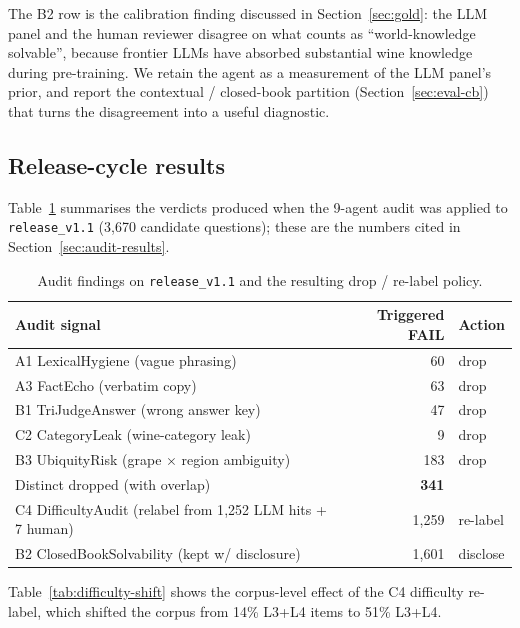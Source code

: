 The B2 row is the calibration finding discussed in
Section~\ref{sec:gold}: the LLM panel and the human reviewer disagree
on what counts as ``world-knowledge solvable'', because frontier LLMs
have absorbed substantial wine knowledge during pre-training. We retain
the agent as a measurement of the LLM panel's prior, and report the
contextual / closed-book partition (Section~\ref{sec:eval-cb}) that
turns the disagreement into a useful diagnostic.

\subsection{Release-cycle results}
\label{app:audit-agents}

Table~\ref{tab:audit_results} summarises the verdicts produced when
the 9-agent audit was applied to \texttt{release\_v1.1} (3{,}670
candidate questions); these are the numbers cited in
Section~\ref{sec:audit-results}.

\begin{table}[h]
  \centering
  \caption{Audit findings on \texttt{release\_v1.1} and the resulting
    drop / re-label policy.}
  \label{tab:audit_results}
  \footnotesize
  \begin{tabular}{lrl}
    \toprule
    Audit signal & Triggered FAIL & Action \\
    \midrule
    A1 LexicalHygiene (vague phrasing)               & 60   & drop \\
    A3 FactEcho (verbatim copy)                      & 63   & drop \\
    B1 TriJudgeAnswer (wrong answer key)             & 47   & drop \\
    C2 CategoryLeak (wine-category leak)             & 9    & drop \\
    B3 UbiquityRisk (grape $\times$ region ambiguity)& 183  & drop \\
    \midrule
    Distinct dropped (with overlap)                  & \textbf{341} & \\
    \midrule
    C4 DifficultyAudit (relabel from 1{,}252 LLM hits + 7 human)
                                                     & 1{,}259 & re-label \\
    B2 ClosedBookSolvability (kept w/ disclosure)     & 1{,}601 & disclose \\
    \bottomrule
  \end{tabular}
\end{table}

Table~\ref{tab:difficulty-shift} shows the corpus-level effect of the
C4 difficulty re-label, which shifted the corpus from 14\% L3+L4 items
to 51\% L3+L4.

